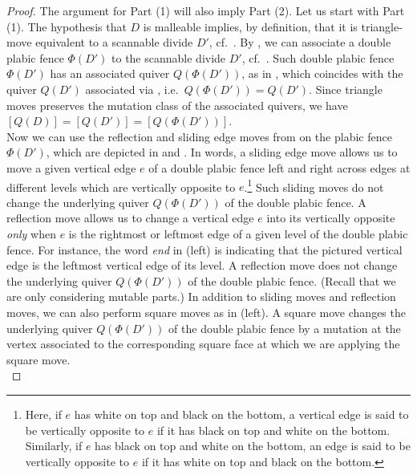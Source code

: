 \begin{proof} The argument for Part (1) will also imply Part (2). Let us start with Part (1). The hypothesis that $D$ is malleable implies, by definition, that it is triangle-move equivalent to a scannable divide $D'$, cf.~\cite[Definition 14.9]{FPST}. By \cite[Definition 12.2]{FPST}, we can associate a double plabic fence $\Phi(D')$ to the scannable divide $D'$, cf.~. Such double plabic fence $\Phi(D')$ has an associated quiver $Q(\Phi(D'))$, as in \cite[Def.~6.8]{FPST}, which coincides with the quiver $Q(D')$ associated via \cite[Def.~4.2]{FPST}, i.e.~$Q(\Phi(D'))=Q(D')$. Since triangle moves preserves the mutation class of the associated quivers, we have $[Q(D)]=[Q(D')]=[Q(\Phi(D'))]$.\\

Now we can use the reflection and sliding edge moves from \cite[Sect.~5.2\&5.3]{CasalsWeng22} on the plabic fence $\Phi(D')$, which are depicted in  and . In words, a sliding edge move allows us to move a given vertical edge $e$ of a double plabic fence left and right across edges at different levels which are vertically opposite to $e$.\footnote{Here, if $e$ has white on top and black on the bottom, a vertical edge is said to be vertically opposite to $e$ if it has black on top and white on the bottom. Similarly, if $e$ has black on top and white on the bottom, an edge is said to be vertically opposite to $e$ if it has white on top and black on the bottom.} Such sliding moves do not change the underlying quiver $Q(\Phi(D'))$ of the double plabic fence. A reflection move allows us to change a vertical edge $e$ into its vertically opposite {\it only} when $e$ is the rightmost or leftmost edge of a given level of the double plabic fence. For instance, the word {\it end} in  (left) is indicating that the pictured vertical edge is the leftmost vertical edge of its level. A reflection move does not change the underlying quiver $Q(\Phi(D'))$ of the double plabic fence. (Recall that we are only considering mutable parts.) In addition to sliding moves and reflection moves, we can also perform square moves as in  (left). A square move changes the underlying quiver $Q(\Phi(D'))$ of the double plabic fence by a mutation at the vertex associated to the corresponding square face at which we are applying the square move.\\


\end{proof}
